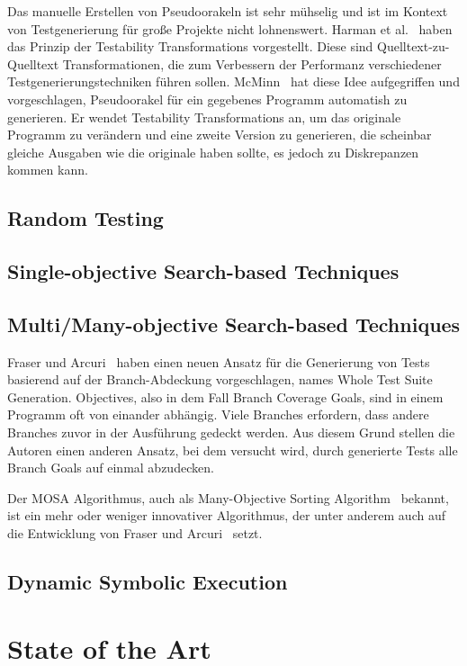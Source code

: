 \documentclass{article}
\begin{document}
Das manuelle Erstellen von Pseudoorakeln ist sehr mühselig und ist im Kontext von Testgenerierung für große Projekte nicht lohnenswert. Harman et al.~\cite{1265732} haben das Prinzip der Testability Transformations vorgestellt. Diese sind Quelltext-zu-Quelltext Transformationen, die zum Verbessern der Performanz verschiedener Testgenerierungstechniken führen sollen. McMinn~\cite{10.1145/1569901.1570127} hat diese Idee aufgegriffen und vorgeschlagen, Pseudoorakel für ein gegebenes Programm automatish zu generieren. Er wendet Testability Transformations an, um das originale Programm zu verändern und eine zweite Version zu generieren, die scheinbar gleiche Ausgaben wie die originale haben sollte, es jedoch zu Diskrepanzen kommen kann. 

\subsection{Random Testing}
\subsection{Single-objective Search-based Techniques}
\subsection{Multi/Many-objective Search-based Techniques}
Fraser und Arcuri~\cite{Fraser_2013} haben einen neuen Ansatz für die Generierung von Tests basierend auf der Branch-Abdeckung vorgeschlagen, names Whole Test Suite Generation. Objectives, also in dem Fall Branch Coverage Goals, sind in einem Programm oft von einander abhängig. Viele Branches erfordern, dass andere Branches zuvor in der Ausführung gedeckt werden. Aus diesem Grund stellen die Autoren einen anderen Ansatz, bei dem versucht wird, durch generierte Tests alle Branch Goals auf einmal abzudecken. 

Der MOSA Algorithmus, auch als Many-Objective Sorting Algorithm~\cite{Panichella_2015} bekannt, ist ein mehr oder weniger innovativer Algorithmus, der unter anderem auch auf die Entwicklung von Fraser und Arcuri~\cite{Fraser_2013} setzt. 
\subsection{Dynamic Symbolic Execution}

\section{State of the Art}
\end{document}
